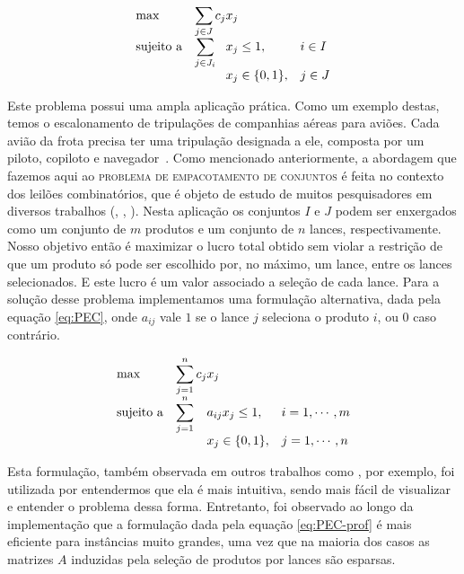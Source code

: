 \documentclass{article}
\begin{document}
	\begin{equation}
		\label{eq:PEC-prof}
        \begin{array}{ll@{}ll}
            \text{max}  & \displaystyle\sum\limits_{j \in J} c_{j}&x_{j} &\\
            \text{sujeito a}& \displaystyle\sum\limits_{j \in J_i}   &x_{j} \leq 1,  &i \in I\\
                 &                                                &x_{j} \in \{0,1\}, &j \in J
        \end{array}
    \end{equation}
    
	Este problema possui uma ampla aplicação prática. Como um exemplo destas, temos o escalonamento de tripulações de companhias aéreas para aviões. Cada avião da frota precisa ter uma tripulação designada a ele, composta por um piloto, copiloto e navegador~\cite{Airline}.    
    Como mencionado anteriormente, a abordagem que fazemos aqui ao \textsc{problema de empacotamento de conjuntos} é feita no contexto dos leilões combinatórios, que é objeto de estudo de muitos pesquisadores em diversos trabalhos (\cite{Winner}, \cite{Taming}, \cite{CABOB}). Nesta aplicação os conjuntos $I$ e $J$ podem ser enxergados como um conjunto de $m$ produtos e um conjunto de $n$ lances, respectivamente. Nosso objetivo então é maximizar o lucro total obtido sem violar a restrição de que um produto só pode ser escolhido por, no máximo, um lance, entre os lances selecionados. E este lucro é um valor associado a seleção de cada lance. 
    Para a solução desse problema implementamos uma formulação alternativa, dada pela equação \ref{eq:PEC}, onde $ a_{ij} $ vale $ 1 $ se o lance $ j $ seleciona o produto $ i $, ou $ 0 $ caso contrário.
    
    \begin{equation}
    	\label{eq:PEC}
    	\begin{array}{ll@{}ll}
    		\text{max}  & \displaystyle\sum\limits_{j = 1}^{n} c_{j} & x_{j} &\\
    		\text{sujeito a}& \displaystyle\sum\limits_{j = 1}^{n}   & a_{ij}x_{j} \leq 1,  & i=1,\cdots,m\\
    		&                                                &x_{j} \in \{0,1\}, & j = 1,\cdots,n
    	\end{array}
    \end{equation}
    
    Esta formulação, também observada em outros trabalhos como \cite{guo2005using}, por exemplo, foi utilizada por entendermos que ela é mais intuitiva, sendo mais fácil de visualizar e entender o problema dessa forma. Entretanto, foi observado ao longo da implementação que a formulação dada pela equação \ref{eq:PEC-prof} é mais eficiente para instâncias muito grandes, uma vez que na maioria dos casos as matrizes $ A $ induzidas pela seleção de produtos por lances são esparsas. 
	
\end{document}
